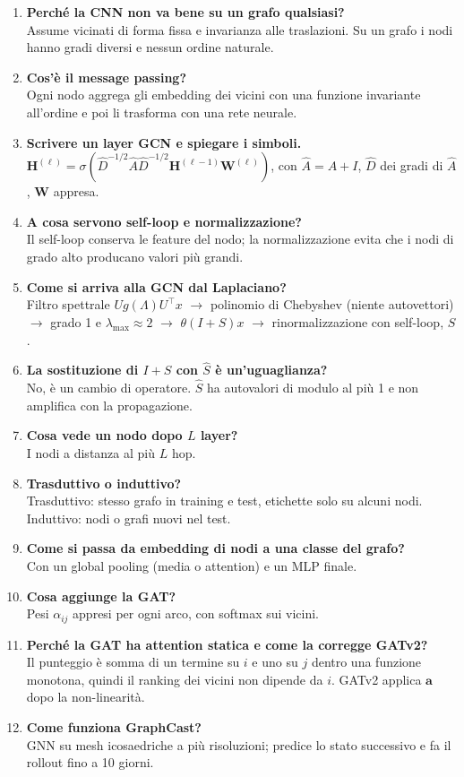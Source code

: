 \documentclass[11pt,a4paper]{article}
\begin{document}
\begin{enumerate}[label=\textbf{D\arabic*.}, leftmargin=*]
  \item \textbf{Perché la CNN non va bene su un grafo qualsiasi?}\\
  Assume vicinati di forma fissa e invarianza alle traslazioni. Su un grafo i
  nodi hanno gradi diversi e nessun ordine naturale.
  \item \textbf{Cos'è il message passing?}\\
  Ogni nodo aggrega gli embedding dei vicini con una funzione invariante
  all'ordine e poi li trasforma con una rete neurale.
  \item \textbf{Scrivere un layer GCN e spiegare i simboli.}\\
  $\mathbf{H}^{(\ell)}=\sigma(\hat{D}^{-1/2}\hat{A}\hat{D}^{-1/2}\mathbf{H}^{(\ell-1)}\mathbf{W}^{(\ell)})$, con
  $\hat{A}=A+I$, $\hat{D}$ dei gradi di $\hat{A}$, $\mathbf{W}$ appresa.
  \item \textbf{A cosa servono self-loop e normalizzazione?}\\
  Il self-loop conserva le feature del nodo; la normalizzazione evita che i nodi
  di grado alto producano valori più grandi.
  \item \textbf{Come si arriva alla GCN dal Laplaciano?}\\
  Filtro spettrale $Ug(\Lambda)U^\top x$ $\to$ polinomio di Chebyshev (niente
  autovettori) $\to$ grado 1 e $\lambda_{\max}\approx2$ $\to$ $\theta(I+S)x$ $\to$
  rinormalizzazione con self-loop, $\hat{S}$.
  \item \textbf{La sostituzione di $I+S$ con $\hat{S}$ è un'uguaglianza?}\\
  No, è un cambio di operatore. $\hat{S}$ ha autovalori di modulo al più 1 e non
  amplifica con la propagazione.
  \item \textbf{Cosa vede un nodo dopo $L$ layer?}\\
  I nodi a distanza al più $L$ hop.
  \item \textbf{Trasduttivo o induttivo?}\\
  Trasduttivo: stesso grafo in training e test, etichette solo su alcuni nodi.
  Induttivo: nodi o grafi nuovi nel test.
  \item \textbf{Come si passa da embedding di nodi a una classe del grafo?}\\
  Con un global pooling (media o attention) e un MLP finale.
  \item \textbf{Cosa aggiunge la GAT?}\\
  Pesi $\alpha_{ij}$ appresi per ogni arco, con softmax sui vicini.
  \item \textbf{Perché la GAT ha attention statica e come la corregge GATv2?}\\
  Il punteggio è somma di un termine su $i$ e uno su $j$ dentro una funzione
  monotona, quindi il ranking dei vicini non dipende da $i$. GATv2 applica
  $\mathbf{a}$ dopo la non-linearità.
  \item \textbf{Come funziona GraphCast?}\\
  GNN su mesh icosaedriche a più risoluzioni; predice lo stato successivo e
  fa il rollout fino a 10 giorni.
\end{enumerate}
\end{document}
